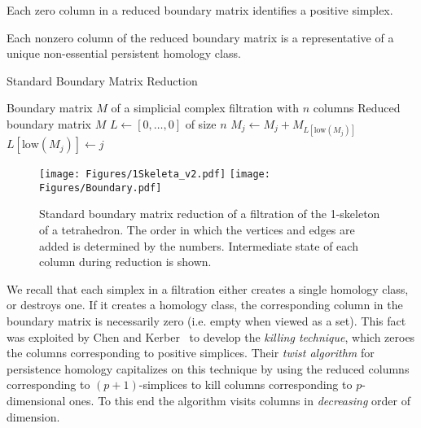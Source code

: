 \begin{property}
\label{prop:zero_columns}
Each zero column in a reduced boundary matrix identifies a positive simplex.
\end{property}

\begin{property}
\label{prop:nonzero_columns}
Each nonzero column of the reduced boundary matrix is a representative of a unique non-essential persistent homology class.    
\end{property}


\begin{algorithm}
\caption{Standard Boundary Matrix Reduction}
\label{alg:claspers}
\begin{algorithmic}[1]

\Require Boundary matrix $M$ of a simplicial complex filtration with $n$ columns
\Ensure Reduced boundary matrix $M$
\State $L\gets [0,\dots,0]$ of size $n$
    \State $M_{j}\gets M_j+M_{L[\text{low}(M_j)]}$
\EndWhile
{}
    \State $L[\text{low}(M_j)] \gets j$
\EndIf
\EndFor
\end{algorithmic}
\end{algorithm}



\begin{figure}[ht!]
    \centering
    \texttt{[image: Figures/1Skeleta\_v2.pdf]}
    \texttt{[image: Figures/Boundary.pdf]}
    \caption{Standard boundary matrix reduction of a filtration of the 1-skeleton of a tetrahedron. The order in which the vertices and edges are added is determined by the numbers. Intermediate state of each column during reduction is shown.}
    \label{fig:boundaryReduc}   
\end{figure}


We recall that each simplex in a filtration either creates a single homology class, or destroys one. If it creates a homology class, the corresponding column in the boundary matrix is necessarily zero (i.e. empty when viewed as a set). This fact was exploited by Chen and Kerber~\cite{Chen2011twist} to develop the \emph{killing technique}, which zeroes the columns corresponding to positive simplices. Their \emph{twist algorithm} for persistence homology capitalizes on this technique by using the reduced columns corresponding to $(p+1)$-simplices to kill columns corresponding to $p$-dimensional ones. To this end the algorithm visits columns in \emph{decreasing} order of dimension.

